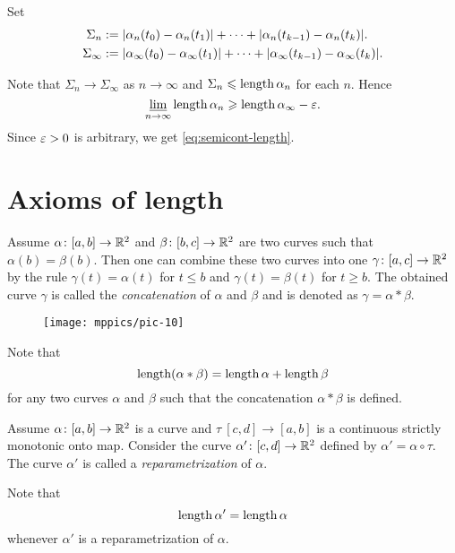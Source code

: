 Set 
\begin{align*}\Sigma_n
&:=
|\alpha_n(t_0)-\alpha_n(t_1)|+\dots+|\alpha_n(t_{k-1})-\alpha_n(t_k)|.
\\
\Sigma_\infty
&:=
|\alpha_\infty(t_0)-\alpha_\infty(t_1)|+\dots+|\alpha_\infty(t_{k-1})-\alpha_\infty(t_k)|.
\end{align*}

Note that $\Sigma_n\to \Sigma_\infty$ as $n\to\infty$
and $\Sigma_n\leqslant\mathop{\rm length}\nolimits\alpha_n$ for each $n$.
Hence
$$\varliminf_{n\to\infty} \mathop{\rm length}\nolimits\alpha_n \geqslant \mathop{\rm length}\nolimits\alpha_\infty-\varepsilon.$$
Since $\varepsilon>0$ is arbitrary, we get \ref{eq:semicont-length}.\qeds

\section{Axioms of length}

Assume $\alpha\colon[a,b]\to \mathbb{R}^2$ and $\beta\:[b,c]\z\to \RR^2$ are two curves such that $\alpha(b)=\beta(b)$.
Then one can combine these two curves into one $\gamma\:[a,c]\z\to \RR^2$ by the rule $\gamma(t)=\alpha(t)$ for $t\le b$ and $\gamma(t) = \beta(t)$ for $t\ge b$.
The obtained curve $\gamma$ is called the 
\emph{concatenation} of $\alpha$ and $\beta$ and is denoted as $\gamma=\alpha*\beta$.

\begin{wrapfigure}{r}{30 mm}
\vskip-0mm
\centering
\texttt{[image: mppics/pic-10]}
\end{wrapfigure}

Note that
\[\mathop{\rm length}\nolimits(\alpha*\beta)=\mathop{\rm length}\nolimits\alpha+\mathop{\rm length}\nolimits\beta\]
for any two curves $\alpha$ and $\beta$ such that the concatenation $\alpha*\beta$ is defined.

Assume $\alpha\colon[a,b]\to \mathbb{R}^2$ is a curve and $\tau\:[c,d]\to [a,b]$ is a continuous strictly monotonic onto map.
Consider the curve $\alpha'\colon[c,d]\to \mathbb{R}^2$ defined by $\alpha'=\alpha\circ\tau$.
The curve $\alpha'$ is called a \emph{reparametrization} of $\alpha$.

Note that 
\[\mathop{\rm length}\nolimits\alpha'=\mathop{\rm length}\nolimits\alpha\]
whenever $\alpha'$ is a reparametrization of $\alpha$.





